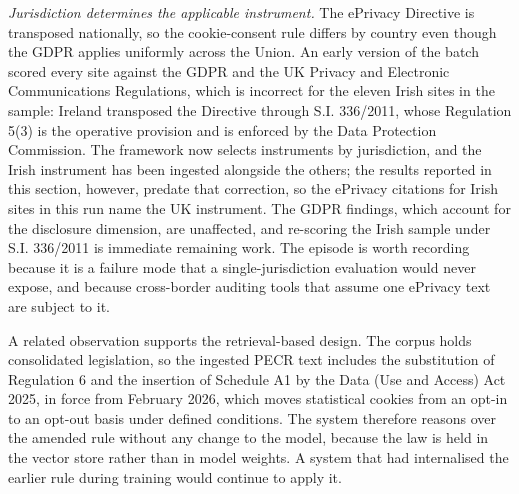 \documentclass[conference]{IEEEtran}
\begin{document}
\emph{Jurisdiction determines the applicable instrument.} The ePrivacy Directive is transposed nationally, so the cookie-consent rule differs by country even though the GDPR applies uniformly across the Union. An early version of the batch scored every site against the GDPR and the UK Privacy and Electronic Communications Regulations, which is incorrect for the eleven Irish sites in the sample: Ireland transposed the Directive through S.I. 336/2011, whose Regulation 5(3) is the operative provision and is enforced by the Data Protection Commission. The framework now selects instruments by jurisdiction, and the Irish instrument has been ingested alongside the others; the results reported in this section, however, predate that correction, so the ePrivacy citations for Irish sites in this run name the UK instrument. The GDPR findings, which account for the disclosure dimension, are unaffected, and re-scoring the Irish sample under S.I. 336/2011 is immediate remaining work. The episode is worth recording because it is a failure mode that a single-jurisdiction evaluation would never expose, and because cross-border auditing tools that assume one ePrivacy text are subject to it.

A related observation supports the retrieval-based design. The corpus holds consolidated legislation, so the ingested PECR text includes the substitution of Regulation 6 and the insertion of Schedule A1 by the Data (Use and Access) Act 2025, in force from February 2026, which moves statistical cookies from an opt-in to an opt-out basis under defined conditions. The system therefore reasons over the amended rule without any change to the model, because the law is held in the vector store rather than in model weights. A system that had internalised the earlier rule during training would continue to apply it.
\end{document}
